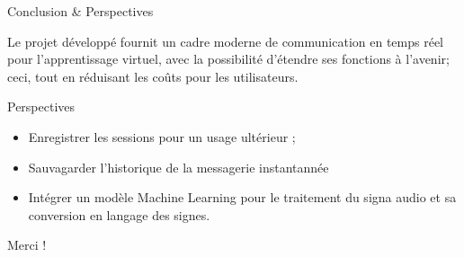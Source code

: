 \documentclass{beamer}
\begin{document}
\begin{frame}{Conclusion \& Perspectives}
  \begin{block}{}
    Le projet développé fournit un cadre moderne de communication 
    en temps réel pour l'apprentissage virtuel, avec la possibilité d'étendre ses fonctions à l'avenir;
    ceci, tout en réduisant les coûts pour les utilisateurs.
  \end{block}

  \begin{block}{Perspectives}
    \begin{itemize}
      \item Enregistrer les sessions pour un usage ultérieur ;
      \item Sauvagarder l'historique de la messagerie instantannée
      \item Intégrer un modèle Machine Learning pour le traitement du signa audio et sa conversion
      en langage des signes.
    \end{itemize}
  \end{block}
\end{frame}

\begin{frame}
  \begin{center}
  \Huge{Merci !}
  \end{center}

\end{frame}
\end{document}

